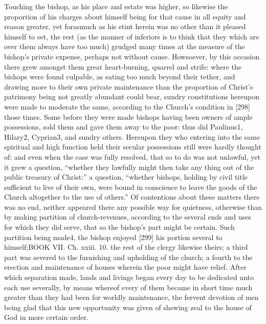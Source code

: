 Touching the bishop, as his place and estate was higher, so likewise the proportion of his charges about himself being for that cause in all equity and reason greater, yet forasmuch as his stint herein was no other than it pleased himself to set, the rest (as the manner of inferiors is to think that they which are over them always have too much) grudged many times at the measure of the bishop’s private expense, perhaps not without cause. Howsoever, by this occasion there grew amongst them great heart-burning, quarrel and strife: where the bishops were found culpable, as eating too much beyond their tether, and drawing more to their own private maintenance than the proportion of Christ’s patrimony being not greatly abundant could bear, sundry constitutions hereupon were made to moderate the same, according to the Church’s condition in [298] those times. Some before they were made bishops having been owners of ample possessions, sold them and gave them away to the poor: thus did Paulinus1, Hilary2, Cyprian3, and sundry others. Hereupon they who entering into the same spiritual and high function held their secular possessions still were hardly thought of: and even when the case was fully resolved, that so to do was not unlawful, yet it grew a question, “whether they lawfully might then take any thing out of the public treasury of Christ:” a question, “whether bishops, holding by civil title sufficient to live of their own, were bound in conscience to leave the goods of the Church altogether to the use of others.” Of contentions about these matters there was no end, neither appeared there any possible way for quietness, otherwise than by making partition of church-revenues, according to the several ends and uses for which they did serve, that so the bishop’s part might be certain. Such partition being made4, the bishop enjoyed [299] his portion several to himself;BOOK VII. Ch. xxiii. 10. the rest of the clergy likewise theirs; a third part was severed to the furnishing and upholding of the church; a fourth to the erection and maintenance of houses wherein the poor might have relief. After which separation made, lands and livings began every day to be dedicated unto each use severally, by means whereof every of them became in short time much greater than they had been for worldly maintenance, the fervent devotion of men being glad that this new opportunity was given of shewing zeal to the house of God in more certain order.

